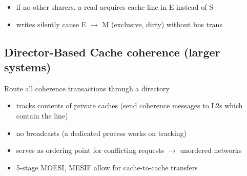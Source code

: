 \begin{itemize}
\item if no other sharers, a read acquires cache line in \textsf{E} instead of \textsf{S}
\item writes silently cause \textsf{E} $\to$ \textsf{M} (exclusive, dirty) without bus trans
\end{itemize}
\subsection*{Director-Based Cache coherence (larger systems)}
Route all coherence transactions through a directory
\begin{itemize}
\item tracks contents of private caches (send coherence messages to L2s which contain the line)
\item no broadcasts (a dedicated process works on tracking)
\item serves as ordering point for conflicting requests $\to$ unordered networks
\item 5-stage MOESI, MESIF allow for cache-to-cache transfers
\end{itemize}
